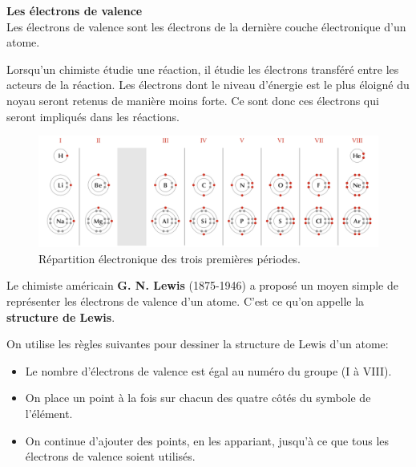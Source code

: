 \documentclass[
  11pt,
  a4paper,
  openany]{book}
\providecommand{\tightlist}{%
  \setlength{\itemsep}{0pt}\setlength{\parskip}{0pt}}
\begin{document}
\begin{tcolorbox}
\textbf{Les électrons de valence}\\
Les électrons de valence sont les électrons de la dernière couche électronique d'un atome.

\end{tcolorbox}

Lorsqu'un chimiste étudie une réaction, il étudie les électrons transféré entre les acteurs de la réaction. Les électrons dont le niveau d'énergie est le plus éloigné du noyau seront retenus de manière moins forte. Ce sont donc ces électrons qui seront impliqués dans les réactions.

\begin{figure}

{\centering \includegraphics[width=1\linewidth]{images/configuration-electronique} 

}

\caption{Répartition électronique des trois premières périodes.}\label{fig:configuration-electronique}
\end{figure}

Le chimiste américain \textbf{G. N. Lewis} (1875-1946) a proposé un moyen simple de représenter les électrons de valence d'un atome. C'est ce qu'on appelle la \textbf{structure de Lewis}.

\clearpage

On utilise les règles suivantes pour dessiner la structure de Lewis d'un atome:

\begin{itemize}
\tightlist
\item
  Le nombre d'électrons de valence est égal au numéro du groupe (I à VIII).
\item
  On place un point à la fois sur chacun des quatre côtés du symbole de l'élément.
\item
  On continue d'ajouter des points, en les appariant, jusqu'à ce que tous les électrons de valence soient utilisés.
\end{itemize}
\end{document}
